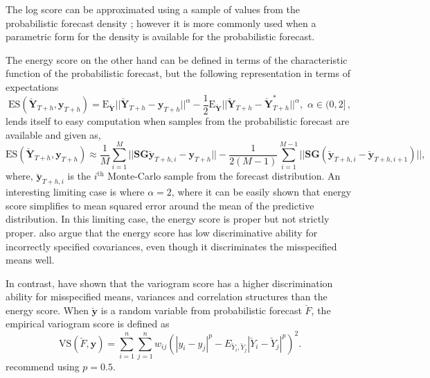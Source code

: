\documentclass[12pt]{article}
\def\E{\text{E}}
\theoremstyle{definition}
\begin{document}
The log score can be approximated using a sample of values from the probabilistic forecast density \citep{Jordan2017}; however it is more commonly used when a parametric form for the density is available for the probabilistic forecast.

The energy score on the other hand can be defined in terms of the characteristic function of the probabilistic forecast, but the following representation in terms of expectations
\begin{equation}\label{eq:Energy_score}
\text{ES}(\breve{\bm{Y}}_{T+h},\bm{y}_{T+h}) =
\E_{\breve{\bm{Y}}}
||\breve{\bm{Y}}_{T+h}-\bm{y}_{T+h}||^\alpha -\frac{1}{2}\E_{\breve{\bm{Y}}}||\breve{\bm{Y}}_{T+h}-\breve{\bm{Y}}^*_{T+h}||^\alpha, \,\, \alpha \in (0,2]\,, 
\end{equation}
lends itself to easy computation when samples from the probabilistic forecast are available and given as, 
\begin{equation}\label{eq:ES_with_MCSamples}
\text{ES}(\breve{\bm{Y}}_{T+h},\bm{y}_{T+h}) \approx \frac{1}{M}\sum_{i=1}^{M}||\bm{SG}\breve{\bm{y}}_{T+h,i} -\bm{y}_{T+h}||-\frac{1}{2(M-1)}\sum_{i=1}^{M-1}||\bm{SG}(\breve{\bm{y}}_{T+h,i} -\breve{\bm{y}}_{T+h,i+1})||,
\end{equation}
where, $\breve{\bm{y}}_{T+h,i}$ is the $i^\text{th}$ Monte-Carlo sample from the forecast distribution. An interesting limiting case is where $\alpha=2$, where it can be easily shown that energy score simplifies to mean squared error around the mean of the predictive distribution. In this limiting case, the energy score is proper but not strictly proper. \citet{Pinson2013a} also argue that the energy score has low discriminative ability for incorrectly specified covariances, even though it discriminates the misspecified means well.

In contrast, \citet{SCHEUERER2015} have shown that the variogram score has a higher discrimination ability for misspecified means, variances and correlation structures than the energy score. When $\breve{\bm{y}}$ is a random variable from probabilistic forecast $\breve{F}$, the empirical variogram score is defined as
\begin{equation}
\text{VS}(\breve{F}, \bm{y}) = \displaystyle\sum_{i=1}^{n}\displaystyle\sum_{j=1}^{n}w_{ij}\left(|y_{i} - y_{j}|^p - E_{\breve{Y}_i,\breve{Y}_j} |\breve{Y}_{i}-\breve{Y}_{j}|^p\right)^2.
\end{equation}
\citet{SCHEUERER2015} recommend using $p=0.5$.
\end{document}
